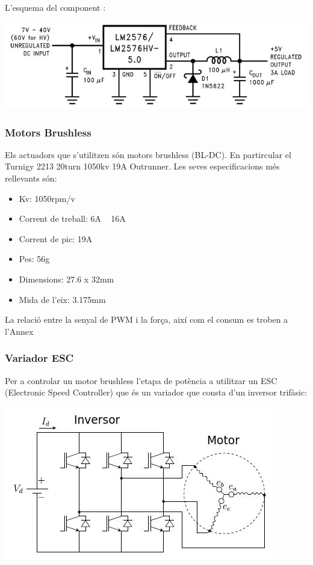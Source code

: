 \documentclass[twoside]{article}
\begin{document}
L'esquema del component \cite{lm2576s}:

\begin{center}
\includegraphics[scale=0.55]{images/lm2576s.jpeg} 
\end{center}

\subsubsection*{Motors Brushless}
Els actuadors que s'utilitzen són motors brushless (BL-DC). En partircular el Turnigy 2213 20turn 1050kv 19A Outrunner. Les seves especificacions més rellevants són:
\begin{itemize}
\item Kv: 1050rpm/v
\item Corrent de treball: 6A ~ 16A
\item Corrent de pic: 19A
\item Pes: 56g
\item Dimensions: 27.6 x 32mm
\item Mida de l'eix: 3.175mm
\end{itemize}
La relació entre la senyal de PWM i la força, així com el consum es troben a l'Annex
\subsubsection*{Variador ESC}

Per a controlar un motor brushless l'etapa de potència a utilitzar un ESC (Electronic Speed Controller) que és un  variador que consta d'un inversor trifàsic:
\begin{center}
\includegraphics[scale=0.4]{images/ESC.jpeg}
\end{center}
\end{document}
